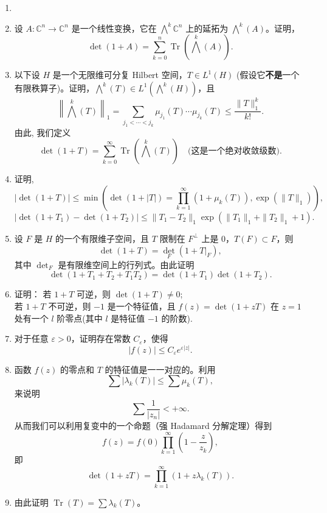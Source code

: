 \begin{enumerate}
    \item[七、]
    \item[(a)] 设 $ A: \mathbb{C}^n \to \mathbb{C}^n $ 是一个线性变换，它在 $\bigwedge^{k} \mathbb{C}^n$ 上的延拓为 $\bigwedge^{k}(A)$。证明，
    \[
    \det(1 + A) = \sum_{k=0}^{n} \operatorname{Tr}\left(\bigwedge^{k}(A)\right).
    \]
    \item[(b)] 以下设 $ H $ 是一个无限维可分复 Hilbert 空间，$ T \in L^1(H) $ (假设它\textbf{不是}一个有限秩算子)。证明，$\bigwedge^{k}(T) \in L^1(\bigwedge^{k}(H))$，且
    \[
    \left\| \bigwedge^{k}(T) \right\|_1 = \sum_{j_1 < \cdots < j_k} \mu_{j_1}(T) \cdots \mu_{j_k}(T) \leq \frac{\|T\|_1^k}{k!}.
    \]
    由此, 我们定义
    \[
    \det(1 + T) = \sum_{k=0}^{\infty} \operatorname{Tr}\left(\bigwedge^{k}(T)\right) \quad \text{(这是一个绝对收敛级数)}.
    \]
    \item[(c)] 证明, 
    \[
    |\det(1 + T)| \leq \min \left( \det(1 + |T|)=  \prod_{k=1}^{\infty} (1 + \mu_k(T)), \exp(\|T\|_1) \right),
    \]
    \[
    |\det(1 + T_1) - \det(1 + T_2)| \leq \|T_1 - T_2\|_1 \exp(\|T_1\|_1 + \|T_2\|_1 + 1).
    \]
    \item[(d)] 设 $ F $ 是 $ H $ 的一个有限维子空间，且 $ T $ 限制在 $ F^\perp $ 上是 $0$，$ T(F) \subset F $，则
    \[
    \det(1 + T) = \det_F (1 + T|_F),
    \]
    其中 $ \det_F $ 是有限维空间上的行列式。由此证明
    \[
    \det(1 + T_1 + T_2 + T_1 T_2) = \det(1 + T_1) \det(1 + T_2).
    \]
    \item[(e*)] 证明： 若 $ 1 + T $ 可逆，则 $ \det(1 + T) \neq 0 $;\\
    若 $ 1 + T $ 不可逆，则 $-1$ 是一个特征值，且 $ f(z) = \det(1 + zT) $ 在 $ z = 1 $ 处有一个 $ l $ 阶零点(其中 $ l $ 是特征值 $-1$ 的阶数).
    \item[(f)] 对于任意 $ \varepsilon > 0 $，证明存在常数 $ C_\varepsilon $，使得
    \[
    |f(z)| \leq C_\varepsilon e^{\varepsilon |z|}.
    \]
    \item[(g)] 函数 $ f(z) $ 的零点和 $ T $ 的特征值是一一对应的。利用
    \[
    \sum |\lambda_k(T)| \leq \sum \mu_k(T),
    \]
    来说明
    \[
    \sum \frac{1}{|z_n|} < +\infty.
    \]
    从而我们可以利用复变中的一个命题（强 Hadamard 分解定理）得到
    \[
    f(z) = f(0) \prod_{k=1}^{\infty} \left( 1 - \frac{z}{z_k} \right),
    \]
    即
    \[
    \det(1 + zT) = \prod_{k=1}^{\infty} (1 + z\lambda_k(T)).
    \]
    \item[(h)] 由此证明 $ \operatorname{Tr}(T) = \sum \lambda_k(T) $。



\end{enumerate}


